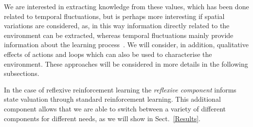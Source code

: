 \documentclass{article}
\begin{document}
We are interested in extracting knowledge from these values, which has been done
related to temporal fluctuations, but %
is perhaps more interesting if spatial variations are considered, as, in this way information directly
related to the environment can be extracted, whereas temporal fluctuations mainly provide
information about the learning process~\cite{herrmann1995efficient}. We will consider, in addition, qualitative effects of actions and loops which can also be used to characterise the environment. These approaches will be considered in more details 
in the following subsections.

In the case of reflexive reinforcement learning the \emph{reflexive component} informs state valuation through standard reinforcement learning. This additional component allows that we are able to switch between a variety of different components for different needs, as we will show in Sect.~\ref{Results}.
\end{document}
